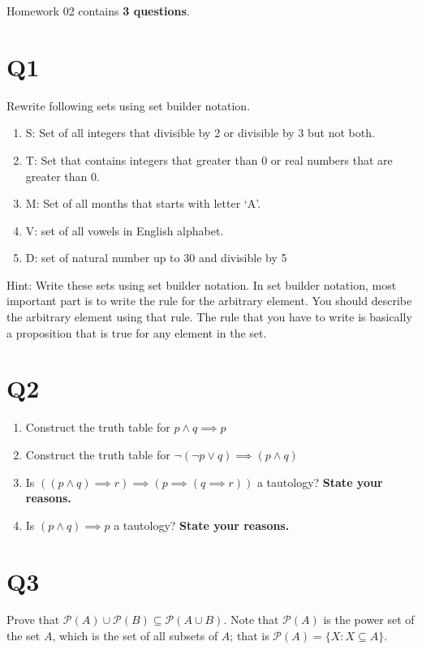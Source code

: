 \documentclass[12pt]{exam}
\begin{document}
Homework 02 contains \textbf{3 questions}.

\section{Q1}
Rewrite following sets using set builder notation.

\begin{enumerate}
    \item S: Set of all integers that divisible by 2 or divisible by 3 but not both.
    \item T: Set that contains integers that greater than $0$ or real numbers that are greater than 0.
    \item M: Set of all months that starts with letter `A'. 
    \item V: set of all vowels in English alphabet.
    \item D: set of natural number up to 30 and divisible by 5
\end{enumerate}

Hint: Write these sets using set builder notation. In set builder notation, most important part is to write the rule for the arbitrary element. You should describe the arbitrary element using that rule. The rule that you have to write is basically a proposition that is true for any element in the set. 


\section{Q2}
\begin{enumerate}
    \item Construct the truth table for $p \wedge q \implies p$
    \item Construct the truth table for $\neg(\neg p \vee q) \implies (p \wedge q)$
    \item Is $((p \wedge q)\implies r) \implies (p \implies (q \implies r))$ a tautology? \textbf{State your reasons.}
    \item Is $(p \wedge q) \implies p$ a tautology? \textbf{State your reasons.}
\end{enumerate}


\section{Q3}
Prove that $\mathcal{P}(A) \cup \mathcal{P}(B) \subseteq \mathcal{P}(A \cup B)$. Note that $\mathcal{P}(A)$ is the power set of the set $A$, which is the set of all subsets of $A$; that is $\mathcal{P}(A) = \{X: X \subseteq A\}$.
\end{document}
